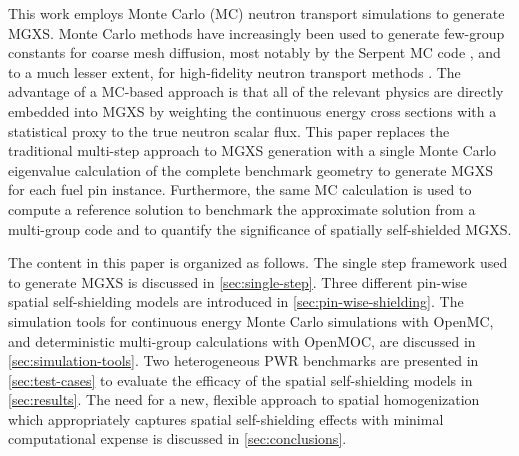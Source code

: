 This work employs Monte Carlo (MC) neutron transport simulations to generate MGXS. Monte Carlo methods have increasingly been used to generate few-group constants for coarse mesh diffusion, most notably by the Serpent MC code \citep{serpent2013manual}, and to a much lesser extent, for high-fidelity neutron transport methods \citep{redmond1997multigroup, nelson2014improved, cai2014condensation, boyd2016thesis}. The advantage of a MC-based approach is that all of the relevant physics are directly embedded into MGXS by weighting the continuous energy cross sections with a statistical proxy to the true neutron scalar flux. This paper replaces the traditional multi-step approach to MGXS generation with a single Monte Carlo eigenvalue calculation of the complete benchmark geometry to generate MGXS for each fuel pin instance. Furthermore, the same MC calculation is used to compute a reference solution to benchmark the approximate solution from a multi-group code and to quantify the significance of spatially self-shielded MGXS.

The content in this paper is organized as follows. The single step framework used to generate MGXS is discussed in \autoref{sec:single-step}. Three different pin-wise spatial self-shielding models are introduced in \autoref{sec:pin-wise-shielding}. The simulation tools for continuous energy Monte Carlo simulations with OpenMC, and deterministic multi-group calculations with OpenMOC, are discussed in \autoref{sec:simulation-tools}. Two heterogeneous PWR benchmarks are presented in \autoref{sec:test-cases} to evaluate the efficacy of the spatial self-shielding models in \autoref{sec:results}. The need for a new, flexible approach to spatial homogenization which appropriately captures spatial self-shielding effects with minimal computational expense is discussed in \autoref{sec:conclusions}.
